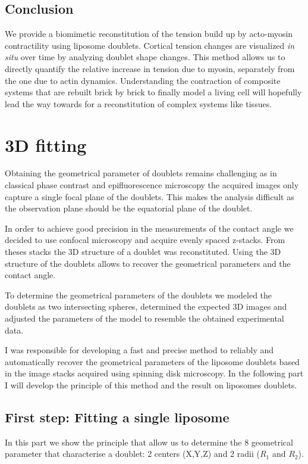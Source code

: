 \documentclass[A4paperpaper,11pt,english]{sphinxmanual}
\begin{document}
\subsection{Conclusion}
\label{index-latex:conclusion}
We provide a biomimetic reconstitution of the tension build up by acto-myosin
contractility using liposome doublets. Cortical tension changes are visualized
\emph{in situ} over time by analyzing doublet shape changes. This method allows us
to directly quantify the relative increase in tension due to myosin, separately
from the one due to actin dynamics. Understanding the contraction of composite systems
that are rebuilt brick by brick to finally model a living cell will hopefully lead the way towards for a reconstitution
of complex systems like tissues.


\section{3D fitting}
\label{index-latex:full3dfit}\label{index-latex:d-fitting}
Obtaining the geometrical parameter of doublets remains challenging as in
classical phase contrast and epifluorescence microscopy the acquired images
only capture a single focal plane of the doublets. This makes the analysis
difficult as the observation plane should be the
equatorial plane of the doublet.

In order to achieve good precision in the measurements of the contact angle we
decided to use confocal microscopy and acquire evenly spaced z-stacks. From
theses stacks the 3D structure of a doublet was reconstituted. Using the 3D
structure of the doublets allows to recover the geometrical parameters and
the contact angle.

To determine the geometrical parameters of the doublets
we modeled the doublets as two intersecting spheres, determined the expected 3D
images and adjusted the parameters of the model to resemble the obtained
experimental data.

I was responsible for developing a fast and precise method to reliably and
automatically recover the geometrical parameters of the liposome doublets
based in the image stacks acquired using spinning disk microscopy. In the following part I will develop the principle of this
method and the result on liposomes doublets.


\subsection{First step: Fitting a single liposome}
\label{index-latex:first-step-fitting-a-single-liposome}
In this part we show the principle that allow us to determine the 8
geometrical parameter that characterise a doublet: 2 centers (X,Y,Z) and 2 radii
(\(R_1\) and \(R_2\)).
\end{document}
